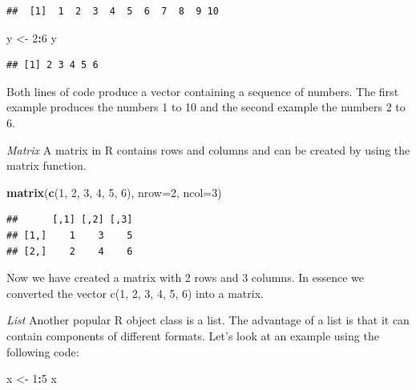 \documentclass[]{book}
\newenvironment{Shaded}{\begin{snugshade}}{\end{snugshade}}
\newcommand{\KeywordTok}[1]{\textcolor[rgb]{0.13,0.29,0.53}{\textbf{#1}}}
\newcommand{\DataTypeTok}[1]{\textcolor[rgb]{0.13,0.29,0.53}{#1}}
\newcommand{\DecValTok}[1]{\textcolor[rgb]{0.00,0.00,0.81}{#1}}
\newcommand{\StringTok}[1]{\textcolor[rgb]{0.31,0.60,0.02}{#1}}
\newcommand{\OperatorTok}[1]{\textcolor[rgb]{0.81,0.36,0.00}{\textbf{#1}}}
\newcommand{\NormalTok}[1]{#1}
\theoremstyle{definition}
\theoremstyle{definition}
\theoremstyle{definition}
\theoremstyle{remark}
\begin{document}
\begin{verbatim}
##  [1]  1  2  3  4  5  6  7  8  9 10
\end{verbatim}

\begin{Shaded}
\begin{Highlighting}[]
\NormalTok{y <-}\StringTok{ }\DecValTok{2}\OperatorTok{:}\DecValTok{6}
\NormalTok{y}
\end{Highlighting}
\end{Shaded}

\begin{verbatim}
## [1] 2 3 4 5 6
\end{verbatim}

Both lines of code produce a vector containing a sequence of numbers.
The first example produces the numbers 1 to 10 and the second example
the numbers 2 to 6.

\emph{Matrix} A matrix in R contains rows and columns and can be created
by using the matrix function.

\begin{Shaded}
\begin{Highlighting}[]
\KeywordTok{matrix}\NormalTok{(}\KeywordTok{c}\NormalTok{(}\DecValTok{1}\NormalTok{, }\DecValTok{2}\NormalTok{, }\DecValTok{3}\NormalTok{, }\DecValTok{4}\NormalTok{, }\DecValTok{5}\NormalTok{, }\DecValTok{6}\NormalTok{), }\DataTypeTok{nrow=}\DecValTok{2}\NormalTok{, }\DataTypeTok{ncol=}\DecValTok{3}\NormalTok{)}
\end{Highlighting}
\end{Shaded}

\begin{verbatim}
##      [,1] [,2] [,3]
## [1,]    1    3    5
## [2,]    2    4    6
\end{verbatim}

Now we have created a matrix with 2 rows and 3 columns. In essence we
converted the vector c(1, 2, 3, 4, 5, 6) into a matrix.

\emph{List} Another popular R object class is a list. The advantage of a
list is that it can contain components of different formats. Let's look
at an example using the following code:

\begin{Shaded}
\begin{Highlighting}[]
\NormalTok{x <-}\StringTok{ }\DecValTok{1}\OperatorTok{:}\DecValTok{5}
\NormalTok{x}
\end{Highlighting}
\end{Shaded}
\end{document}
